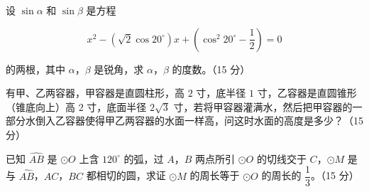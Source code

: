 \begin{question}
设 $\sin\alpha$ 和 $\sin\beta$ 是方程

\nopagebreak[4]
\[
x^{2}-\left(\sqrt{2}\cos 20^\circ\right)x+\left(\cos^{2}20^\circ-\frac{1}{2}\right)=0
\]

的两根，其中 $\alpha$，$\beta$ 是锐角，求 $\alpha$，$\beta$ 的度数。（15 分）

\end{question}

\begin{question}
有甲、乙两容器，甲容器是直圆柱形，高 $2$ 寸，底半径 $1$ 寸，乙容器是直圆锥形（锥底向上）高 $2$ 寸，底面半径 $2\sqrt{3}$ 寸，若将甲容器灌满水，然后把甲容器的一部分水倒入乙容器使得甲乙两容器的水面一样高，问这时水面的高度是多少？（15 分）

\end{question}

\Needspace{0.4\textheight}
\begin{question}
已知 $\widehat{AB}$ 是 $\odot O$ 上含 $120^\circ$ 的弧，过 $A$，$B$ 两点所引 $\odot O$ 的切线交于 $C$，$\odot M$ 是与 $\widehat{AB}$，$AC$，$BC$ 都相切的圆，求证 $\odot M$ 的周长等于 $\odot O$ 的周长的 $\dfrac{1}{3}$。（15 分）
\nopagebreak[4]
\begin{center}\end{center}
\nopagebreak[4]

\end{question}